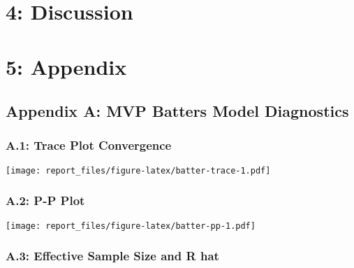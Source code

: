 \documentclass[
]{article}
\begin{document}
\hypertarget{discussion}{%
\section{4: Discussion}\label{discussion}}

\hypertarget{appendix}{%
\section{5: Appendix}\label{appendix}}

\hypertarget{appendix-a-mvp-batters-model-diagnostics}{%
\subsection{Appendix A: MVP Batters Model
Diagnostics}\label{appendix-a-mvp-batters-model-diagnostics}}

\hypertarget{a.1-trace-plot-convergence}{%
\subsubsection{A.1: Trace Plot
Convergence}\label{a.1-trace-plot-convergence}}

\texttt{[image: report\_files/figure-latex/batter-trace-1.pdf]}

\hypertarget{a.2-p-p-plot}{%
\subsubsection{A.2: P-P Plot}\label{a.2-p-p-plot}}

\texttt{[image: report\_files/figure-latex/batter-pp-1.pdf]}

\hypertarget{a.3-effective-sample-size-and-r-hat}{%
\subsubsection{A.3: Effective Sample Size and R
hat}\label{a.3-effective-sample-size-and-r-hat}}
\end{document}
